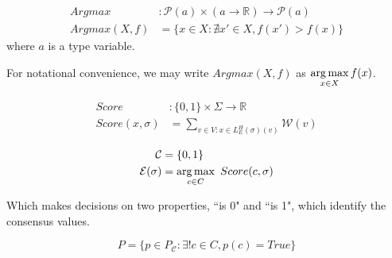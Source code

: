 \begin{defn}[Argmax]
\begin{align*}
Argmax &: \mathcal{P}(a) \times (a \to \mathbb{R}) \to \mathcal{P}(a) \\
Argmax(X, f) &= \{x \in X : \nexists x' \in X, f(x') > f(x)\}
\end{align*}
where $a$ is a type variable.
\end{defn}

For notational convenience, we may write $Argmax(X, f)$ as $\operatorname*{arg\,max}\limits_{x \in X} f(x)$.


\begin{defn}[Score]
\begin{align*}
Score &: \{0, 1\} \times \Sigma \to \mathbb{R} \\
Score(x, \sigma) &= \sum_{v \in V: x \in L^H_E(\sigma)(v)} \mathcal{W}(v)
\end{align*}
\end{defn}


\begin{defn}
\begin{align*}
\mathcal{C} &= \{0, 1\} \\
\mathcal{E}(\sigma) &= \operatorname*{arg\,max}\limits_{c \in C} ~Score(c, \sigma)
\end{align*}
\end{defn}

Which makes decisions on two properties, ``is 0" and ``is 1", which identify the consensus values.

\begin{defn}
$$
P = \{p \in P_{\mathcal{C}} : \exists ! c \in C, p(c) = True\}
$$
\end{defn}

\iffalse

\begin{thm}
$\forall p \in P$,
$$
Max\_Driven(p)
$$
\end{thm}

\begin{proof}
We say that $p(i) = True \land p(1 - i) = False$
\begin{align*}
&Weight(Agreeing(p, \sigma)) > Weight(Disagreeing(p, \sigma)) \\
&\implies Weight(\{v \in \mathcal{V} : \exists c \in L^H_E(\sigma)(v), p(c)\}) > Weight(\{v \in \mathcal{V} : \exists c \in L^H_E(\sigma)(v), \neg p(c)\}) \\
&\implies \sum_{v \in \mathcal{V} : \exists c \in L^H_E(\sigma)(v), p(c)} \mathcal{W}(v) > \sum_{v \in \mathcal{V} : \exists c \in L^H_E(\sigma)(v), \neg p(c)} \mathcal{W}(v) \\
&\implies \sum_{v \in \mathcal{V} : i \in L^H_E(\sigma)(v)} \mathcal{W}(v) > \sum_{v \in \mathcal{V} : 1-i \in L^H_E(\sigma)(v)} \mathcal{W}(v) \\
&\implies \mathcal{E}(\sigma) = \{i\} \\
&\implies \forall c \in \mathcal{E}(\sigma), p(c) \\
\end{align*}
\end{proof}
\fi



